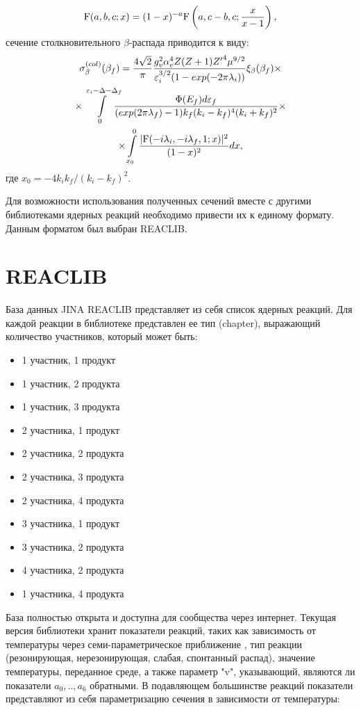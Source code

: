 \documentclass[14pt, a4paper]{article}
\numberwithin{figure}{section}
\numberwithin{equation}{section}
\begin{document}
\begin{eqnarray}
{\rm F}(a,b,c;x)=(1-x)^{-a}{\rm F}\left(a,c-b,c;{x\over{x-1}}\right),\nonumber
\end{eqnarray}
сечение столкновительного $\beta$-распада  приводится к виду:
\begin{multline} \label{sech}
\sigma^{(col)}_\beta(\beta_f)=
{4\sqrt{2}\over \pi} {{g^2_v\alpha_e^4Z (Z+1) {Z'}^4 \mu^{9/2}}
	\over{\varepsilon_i^{3/2} (1-exp(-2\pi\lambda_i))}}
\xi_\beta(\beta_f)
\times\\
\times\int\limits_0^{\varepsilon_i{-}\Delta{-}\Delta_f}\!\!\!\!\!
{{\Phi(E_f) d\varepsilon_f}\over{(exp(2\pi\lambda_f)-1)
		k_f ( k_i- k_f)^4(k_i+k_f)^2}}\times\\
\times\int\limits_{x_0}^0 {{|{\rm F}(-i \lambda_i, -i\lambda_f,1; x)|^2}\over{(1-x)^2}} dx,
\end{multline}
где  $x_0=-4 k_i k_f/(k_i- k_f)^2$.

Для возможности использования полученных сечений вместе с другими библиотеками ядерных реакций необходимо привести их к единому формату. Данным форматом был выбран REACLIB.

\section{REACLIB}

База данных JINA REACLIB представляет из себя список ядерных реакций. Для каждой реакции в библиотеке представлен ее тип (chapter), выражающий количество участников, который может быть:
\begin{itemize}
	\item 1 участник, 1 продукт
	\item 1 участник, 2 продукта
	\item 1 участник, 3 продукта
	\item 2 участника, 1 продукт
	\item 2 участника, 2 продукта
	\item 2 участника, 3 продукта
	\item 2 участника, 4 продукта
	\item 3 участника, 1 продукт
	\item 3 участника, 2 продукта
	\item 4 участника, 2 продукта
	\item 1 участника, 4 продукта
\end{itemize}
 База полностью открыта и доступна для сообщества через интернет. Текущая версия библиотеки хранит показатели реакций, таких как зависимость от температуры через семи-параметрическое приближение \cite{jina}, тип реакции (резонирующая, нерезонирующая, слабая, спонтанный распад), значение температуры, переданное среде, а также параметр "v", указывающий, являются ли показатели $a_0, .., a_6$ обратными. В подавляющем большинстве реакций показатели представляют из себя параметризацию сечения в зависимости от температуры:
\end{document}
